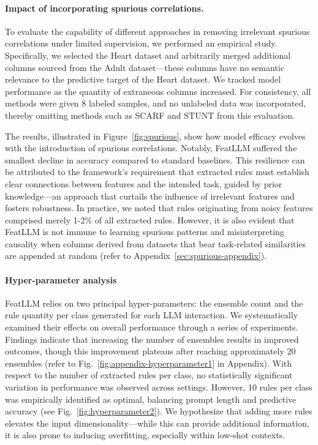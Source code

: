 \vspace*{-0.12in}
\paragraph{Impact of incorporating spurious correlations.} To evaluate the capability of different approaches in removing irrelevant spurious correlations under limited supervision, we performed an empirical study. Specifically, we selected the Heart dataset and arbitrarily merged additional columns sourced from the Adult dataset—these columns have no semantic relevance to the predictive target of the Heart dataset. We tracked model performance as the quantity of extraneous columns increased. For consistency, all methods were given 8 labeled samples, and no unlabeled data was incorporated, thereby omitting methods such as SCARF and STUNT from this evaluation. 

The results, illustrated in Figure~\ref{fig:spurious}, show how model efficacy evolves with the introduction of spurious correlations. Notably, \textsf{FeatLLM} suffered the smallest decline in accuracy compared to standard baselines. This resilience can be attributed to the framework’s requirement that extracted rules must establish clear connections between features and the intended task, guided by prior knowledge—an approach that curtails the influence of irrelevant features and fosters robustness. In practice, we noted that rules originating from noisy features comprised merely 1-2\% of all extracted rules. However, it is also evident that \textsf{FeatLLM} is not immune to learning spurious patterns and misinterpreting causality when columns derived from datasets that bear task-related similarities are appended at random (refer to Appendix~\ref{sec:spurious-appendix}).

\vspace*{-0.12in}
\paragraph{Hyper-parameter analysis}
\textsf{FeatLLM} relies on two principal hyper-parameters: the ensemble count and the rule quantity per class generated for each LLM interaction. We systematically examined their effects on overall performance through a series of experiments. Findings indicate that increasing the number of ensembles results in improved outcomes, though this improvement plateaus after reaching approximately 20 ensembles (refer to Fig.~\ref{fig:appendix-hyperparameter1} in Appendix). With respect to the number of extracted rules per class, no statistically significant variation in performance was observed across settings. However, 10 rules per class was empirically identified as optimal, balancing prompt length and predictive accuracy (see Fig.~\ref{fig:hyperparameter2}). We hypothesize that adding more rules elevates the input dimensionality—while this can provide additional information, it is also prone to inducing overfitting, especially within low-shot contexts.

